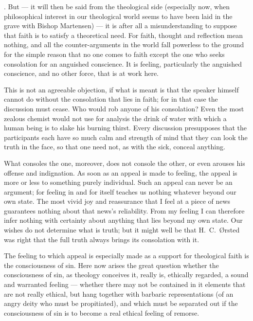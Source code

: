 \documentclass[12pt,a4paper]{article}
\begin{document}
\medskip
{}. But --- it will then be said from the theological side (especially
now, when philosophical interest in our theological world seems to have been
laid in the grave with Bishop Martensen) --- it is after all a misunderstanding
to suppose that faith is to satisfy a theoretical need. For faith, thought and
reflection mean nothing, and all the counter-arguments in the world fall
powerless to the ground for the simple reason that no one comes to faith except
the one who seeks consolation for an anguished conscience. It is feeling,
particularly the anguished conscience, and no other force, that is at work here.

This is not an agreeable objection, if what is meant is that the speaker himself
cannot do without the consolation that lies in faith; for in that case the
discussion must cease. Who would rob anyone of his consolation? Even the most
zealous chemist would not use for analysis the drink of water with which a human
being is to slake his burning thirst. Every discussion presupposes that the
participants each have so much calm and strength of mind that they can look the
truth in the face, so that one need not, as with the sick, conceal anything.

What consoles the one, moreover, does not console the other, or even arouses his
offense and indignation. As soon as an appeal is made to feeling, the appeal is
more or less to something purely individual. Such an appeal can never be an
argument; for feeling in and for itself teaches us nothing whatever beyond our
own state. The most vivid joy and reassurance that I feel at a piece of news
guarantees nothing about that news's reliability. From my feeling I can
therefore infer nothing with certainty about anything that lies beyond my own
state. Our wishes do not determine what is truth; but it might well be that
H.~C.~Ørsted was right that the full truth always brings its consolation with
it.

The feeling to which appeal is especially made as a support for theological
faith is the consciousness of sin. Here now arises the great question whether
the consciousness of sin, as theology conceives it, really is, ethically
regarded, a sound and warranted feeling --- whether there may not be contained
in it elements that are not really ethical, but hang together with barbaric
representations (of an angry deity who must be propitiated), and which must be
separated out if the consciousness of sin is to become a real ethical feeling of
remorse.
\end{document}
